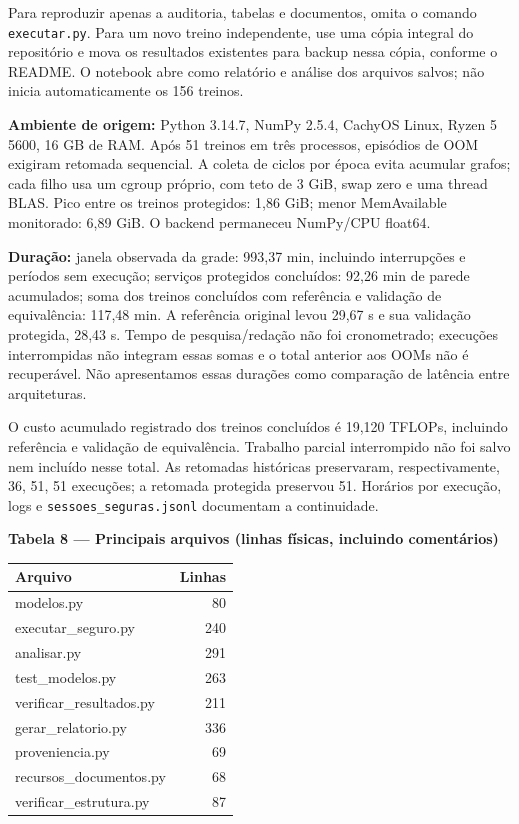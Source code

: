 \documentclass[10pt,a4paper]{article}
\begin{document}
Para reproduzir apenas a auditoria, tabelas e documentos, omita o comando \texttt{executar.py}. Para um novo treino independente, use uma cópia integral do repositório e mova os resultados existentes para backup nessa cópia, conforme o README. O notebook abre como relatório e análise dos arquivos salvos; não inicia automaticamente os 156 treinos.


\textbf{Ambiente de origem:} Python 3.14.7, NumPy 2.5.4, CachyOS Linux, Ryzen 5 5600, 16 GB de RAM. Após 51 treinos em três processos, episódios de OOM exigiram retomada sequencial. A coleta de ciclos por época evita acumular grafos; cada filho usa um cgroup próprio, com teto de 3 GiB, swap zero e uma thread BLAS. Pico entre os treinos protegidos: 1,86 GiB; menor MemAvailable monitorado: 6,89 GiB. O backend permaneceu NumPy/CPU float64.


\textbf{Duração:} janela observada da grade: 993,37 min, incluindo interrupções e períodos sem execução; serviços protegidos concluídos: 92,26 min de parede acumulados; soma dos treinos concluídos com referência e validação de equivalência: 117,48 min. A referência original levou 29,67 s e sua validação protegida, 28,43 s. Tempo de pesquisa/redação não foi cronometrado; execuções interrompidas não integram essas somas e o total anterior aos OOMs não é recuperável. Não apresentamos essas durações como comparação de latência entre arquiteturas.


O custo acumulado registrado dos treinos concluídos é 19,120 TFLOPs, incluindo referência e validação de equivalência. Trabalho parcial interrompido não foi salvo nem incluído nesse total. As retomadas históricas preservaram, respectivamente, 36, 51, 51 execuções; a retomada protegida preservou 51. Horários por execução, logs e \texttt{sessoes\_\allowbreak{}seguras.jsonl} documentam a continuidade.


\noindent\textbf{Tabela 8 — Principais arquivos (linhas físicas, incluindo comentários)}

{\footnotesize\setlength{\tabcolsep}{4pt}\begin{center}\begin{tabular}{lr}\toprule
Arquivo & Linhas\\\midrule
modelos.py & 80\\
executar\_seguro.py & 240\\
analisar.py & 291\\
test\_modelos.py & 263\\
verificar\_resultados.py & 211\\
gerar\_relatorio.py & 336\\
proveniencia.py & 69\\
recursos\_documentos.py & 68\\
verificar\_estrutura.py & 87\\
\bottomrule\end{tabular}\end{center}}
\end{document}
